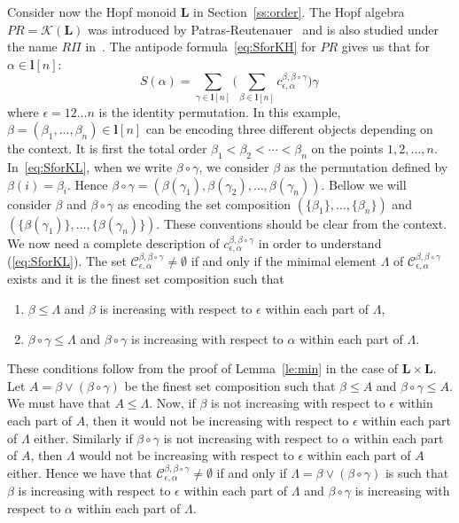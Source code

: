 \documentclass[ALCO,ThmDefs,Unicode,epreuves]{cedram}
\newcommand{\bL}{\mathbf{L}}
\newcommand{\Kc}{\mathcal{K}}
\begin{document}
\begin{exam} \label{ex:PR}
Consider now the Hopf monoid $\bL$ in Section~\ref{ss:order}. The Hopf algebra $PR=\Kc(\bL)$ was introduced by Patras-Reutenauer~\cite{PR:2004} 
and is also studied under the name $R\Pi$ in~\cite{AM:2010}.
The antipode formula~\eqref{eq:SforKH} for $PR$ gives us that for $\alpha\in\mathbf{l}[n]$:
 \begin{equation}\label{eq:SforKL}
 S(\alpha)=\sum_{\gamma\in\mathbf{l}[n]}\Big( \sum_{\beta\in \mathbf{l}[n]} c_{\epsilon,\alpha}^{\beta, \beta\circ\gamma} \Big) \gamma\,
 \end{equation}
 where $\epsilon=12\ldots n$ is the identity permutation.
In this example, $\beta=(\beta_1,\ldots,\beta_n)\in \mathbf{l}[n]$ can be encoding three different objects depending on the context. 
It is first the total order $\beta_1<\beta_2<\cdots<\beta_n$ on the points $1,2,\ldots,n$. In~\eqref{eq:SforKL}, when we write $\beta\circ\gamma$, we consider
$\beta$ as the permutation defined by $\beta(i)=\beta_i$. Hence $\beta\circ\gamma=(\beta(\gamma_1),\beta(\gamma_2),\ldots,\beta(\gamma_n))$.
Bellow we will consider $\beta$ and $\beta\circ\gamma$ as encoding the set composition $(\{\beta_1\},\ldots,\{\beta_n\})$ and $(\{\beta(\gamma_1)\},\ldots,\{\beta(\gamma_n)\})$.
These conventions should be clear from the context.
We now need a complete description of
$c_{\epsilon,\alpha}^{\beta, \beta\circ\gamma}$ in order to understand (\ref{eq:SforKL}). The set $\mathcal{C}_{\epsilon,\alpha}^{\beta, \beta\circ\gamma}\ne \emptyset$ if and only if the minimal element $\Lambda$ of $\mathcal{C}_{\epsilon,\alpha}^{\beta, \beta\circ\gamma}$ exists and it is the finest set composition such that
\begin{enumerate}
 \item $\beta\le\Lambda$ and $\beta$ is increasing with respect to $\epsilon$ within each part of $\Lambda$,
 \item $\beta\circ\gamma\le\Lambda$ and $\beta\circ\gamma$ is increasing with respect to $\alpha$ within each part of $\Lambda$.
 \end{enumerate}
These conditions follow from the proof of Lemma~\ref{le:min} in the case of $\bL\times\bL$. 
Let $A=\beta\lor(\beta\circ\gamma)$ be the finest set composition such that $\beta\le A$ and $\beta\circ\gamma\le A$.
We must have that $A\le \Lambda$. Now, if $\beta$ is not increasing with respect to $\epsilon$ within each part of $A$, then it would not be increasing with respect to $\epsilon$ within each part of $\Lambda$ either. Similarly
if $\beta\circ\gamma$ is not increasing with respect to $\alpha$ within each part of $A$, then $\Lambda$ would not be increasing with respect to $\epsilon$ within each part of $A$ either. Hence we have that $\mathcal{C}_{\epsilon,\alpha}^{\beta, \beta\circ\gamma}\ne \emptyset$ if and only if $\Lambda=\beta\lor(\beta\circ\gamma)$ is such that $\beta$ is increasing with respect to $\epsilon$ within each part of $\Lambda$ and $\beta\circ\gamma$ is increasing with respect to $\alpha$ within each part of $\Lambda$.


\end{exam}
\end{document}
